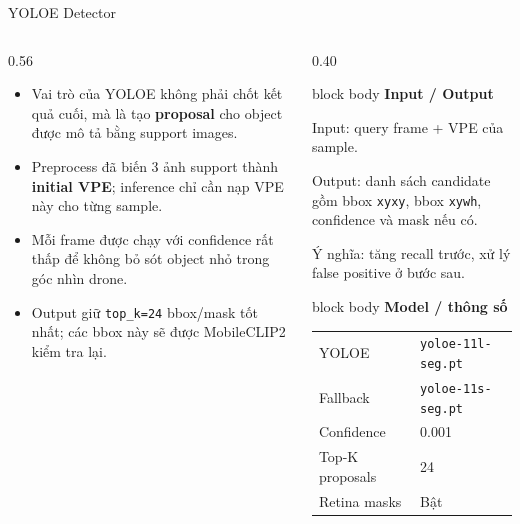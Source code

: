 \documentclass[aspectratio=169]{beamer}
\newcommand{\keyterm}[1]{\textbf{\color{MidBlue}#1}}
\newcommand{\tightitem}{\setlength\itemsep{0.42em}}
\newenvironment{bluebox}[1]{
  \begin{beamercolorbox}[rounded=true,shadow=false,wd=\linewidth,sep=0.28cm]{block body}
  {\bfseries\color{DeepBlue}#1}\par\vspace{0.12cm}
}{
  \end{beamercolorbox}
}
\begin{document}
\begin{frame}{YOLOE Detector}
  \begin{columns}[T,onlytextwidth]
    \begin{column}{0.56\textwidth}
      \begin{itemize}
        \tightitem
        \item Vai trò của YOLOE không phải chốt kết quả cuối, mà là tạo \keyterm{proposal} cho object được mô tả bằng support images.
        \item Preprocess đã biến 3 ảnh support thành \keyterm{initial VPE}; inference chỉ cần nạp VPE này cho từng sample.
        \item Mỗi frame được chạy với confidence rất thấp để không bỏ sót object nhỏ trong góc nhìn drone.
        \item Output giữ \texttt{top\_k=24} bbox/mask tốt nhất; các bbox này sẽ được MobileCLIP2 kiểm tra lại.
      \end{itemize}
    \end{column}
    \begin{column}{0.40\textwidth}
      \begin{bluebox}{Input / Output}
        \scriptsize
        Input: query frame + VPE của sample.\par
        Output: danh sách candidate gồm bbox \texttt{xyxy}, bbox \texttt{xywh}, confidence và mask nếu có.\par
        Ý nghĩa: tăng recall trước, xử lý false positive ở bước sau.
      \end{bluebox}
      \begin{bluebox}{Model / thông số}
        \scriptsize
        \begin{tabular}{ll}
          YOLOE & \texttt{yoloe-11l-seg.pt} \\
          Fallback & \texttt{yoloe-11s-seg.pt} \\
          Confidence & 0.001 \\
          Top-K proposals & 24 \\
          Retina masks & Bật \\
        \end{tabular}
      \end{bluebox}
    \end{column}
  \end{columns}
\end{frame}
\end{document}
